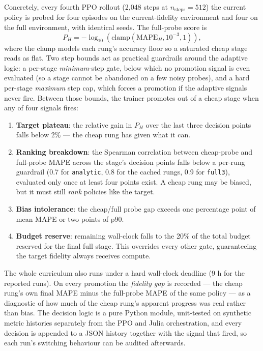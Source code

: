 Concretely, every fourth PPO rollout (2{,}048 steps at
$n_\mathrm{steps}=512$) the current policy is probed for four episodes on the
current-fidelity environment and four on the full environment, with identical
seeds. The full-probe score is
\[
    P_H = -\log_{10}\!\left(\mathrm{clamp}(\mathrm{MAPE}_H,
    10^{-3}, 1)\right),
\]
where the clamp models each rung's accuracy floor so a saturated cheap stage
reads as flat. Two step bounds act as practical guardrails around the adaptive logic: a
per-stage \emph{minimum}-step gate, below which no promotion signal is even
evaluated (so a stage cannot be abandoned on a few noisy probes), and a hard
per-stage \emph{maximum} step cap, which forces a promotion if the adaptive
signals never fire. Between those bounds, the trainer promotes out of a cheap
stage when any of four signals fires:
\begin{enumerate}
\setlength{\itemsep}{1pt}
    \item \textbf{Target plateau}: the relative gain in $P_H$ over
    the last three decision points falls below 2\% --- the cheap rung has
    given what it can.
    \item \textbf{Ranking breakdown}: the Spearman correlation between
    cheap-probe and full-probe MAPE across the stage's decision points falls
    below a per-rung guardrail (0.7 for \texttt{analytic}, 0.8 for the cached
    rungs, 0.9 for \texttt{full3}), evaluated only once at least four points
    exist. A cheap rung may be biased, but it must still \emph{rank} policies
    like the target.
    \item \textbf{Bias intolerance}: the cheap/full probe gap exceeds one
    percentage point of mean MAPE or two points of p90.
    \item \textbf{Budget reserve}: remaining wall-clock falls to the 20\% of
    the total budget reserved for the final full stage. This overrides every
    other gate, guaranteeing the target fidelity always receives compute.
\end{enumerate}
The whole curriculum also runs under a
hard wall-clock deadline (9 h for the reported runs). On every promotion the
\emph{fidelity gap} is recorded --- the cheap rung's own final MAPE minus the
full-probe MAPE of the same policy --- as a diagnostic of how much of the
cheap rung's apparent progress was real rather than bias. The decision logic is
a pure Python module, unit-tested on synthetic metric histories separately from
the PPO and Julia orchestration, and every decision is appended to a JSON
history together with the signal that fired, so each run's switching behaviour
can be audited afterwards.

